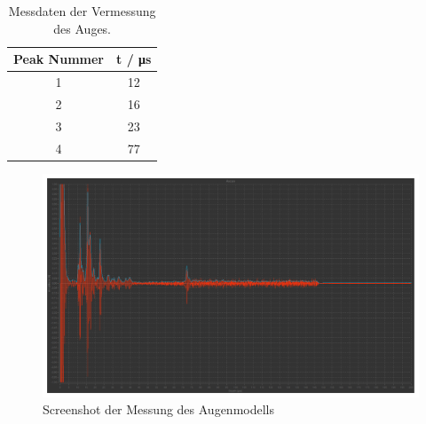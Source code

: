 \begin{table}
  \centering
  \caption{Messdaten der Vermessung des Auges.}
  \label{tab:auge}
  \begin{tabular}{c c}
      \toprule
      Peak Nummer & t / \unit{\micro\second}\\ 
      \midrule
      1 & 12\\
      2 & 16\\
      3 & 23\\
      4 & 77\\
      \bottomrule
  \end{tabular}
\end{table}

\begin{figure}
  \centering
  \includegraphics[width = 0.8\linewidth]{pictures/auge/Messung1Auge.pdf}
  \caption{Screenshot der Messung des Augenmodells}
  \label{fig:auge}
\end{figure}